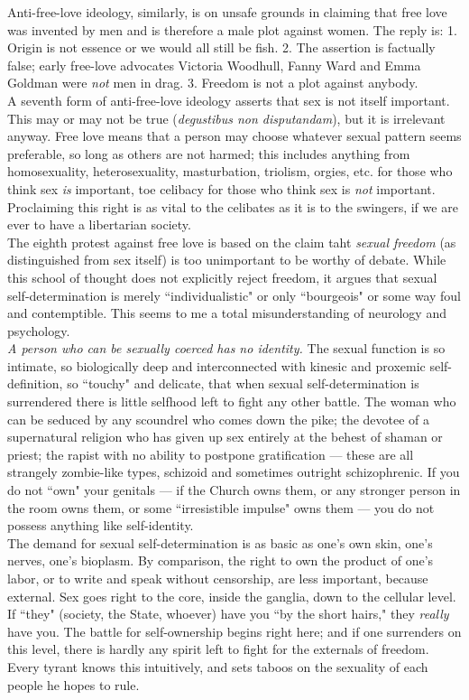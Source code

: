 Anti-free-love ideology, similarly, is on unsafe grounds in claiming that free love was invented by men and is therefore a male plot against women. The reply is: 1. Origin is not essence or we would all still be fish. 2. The assertion is factually false; early free-love advocates Victoria Woodhull, Fanny Ward and Emma Goldman were \emph{not} men in drag. 3. Freedom is not a plot against anybody.\\
A seventh form of anti-free-love ideology asserts that sex is not itself important. This may or may not be true (\emph{degustibus non disputandam}), but it is irrelevant anyway. Free love means that a person may choose whatever sexual pattern seems preferable, so long as others are not harmed; this includes anything from homosexuality, heterosexuality, masturbation, triolism, orgies, etc. for those who think sex \emph{is} important, toe celibacy for those who think sex is \emph{not} important. Proclaiming this right is as vital to the celibates as it is to the swingers, if we are ever to have a libertarian society.\\
The eighth protest against free love is based on the claim taht \emph{sexual freedom} (as distinguished from sex itself) is too unimportant to be worthy of debate. While this school of thought does not explicitly reject freedom, it argues that sexual self-determination is merely ``individualistic" or only ``bourgeois" or some way foul and contemptible. This seems to me a total misunderstanding of neurology and psychology.\\
\emph{A person who can be sexually coerced has no identity.} The sexual function is so intimate, so biologically deep and interconnected with kinesic and proxemic self-definition, so ``touchy" and delicate, that when sexual self-determination is surrendered there is little selfhood left to fight any other battle. The woman who can be seduced by any scoundrel who comes down the pike; the devotee of a supernatural religion who has given up sex entirely at the behest of shaman or priest; the rapist with no ability to postpone gratification --- these are all strangely zombie-like types, schizoid and sometimes outright schizophrenic. If you do not ``own" your genitals --- if the Church owns them, or any stronger person in the room owns them, or some ``irresistible impulse" owns them --- you do not possess anything like self-identity.\\
The demand for sexual self-determination is as basic as one's own skin, one's nerves, one's bioplasm. By comparison, the right to own the product of one's labor, or to write and speak without censorship, are less important, because external. Sex goes right to the core, inside the ganglia, down to the cellular level. If ``they" (society, the State, whoever) have you ``by the short hairs," they \emph{really} have you. The battle for self-ownership begins right here; and if one surrenders on this level, there is hardly any spirit left to fight for the externals of freedom. Every tyrant knows this intuitively, and sets taboos on the sexuality of each people he hopes to rule.\\

